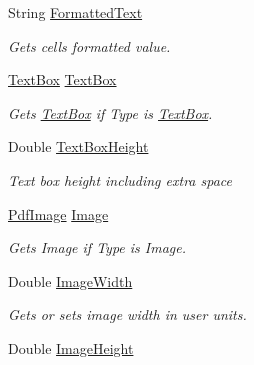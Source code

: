 \begin{DoxyCompactItemize}
String \hyperlink{class_pdf_file_writer_1_1_pdf_table_cell_a3b5c8c5ce7f712cd36ef121752abfe34}{Formatted\+Text}
\begin{DoxyCompactList}\small\item\em Gets cell\textquotesingle{}s formatted value. \end{DoxyCompactList}\item 
\hyperlink{class_pdf_file_writer_1_1_text_box}{Text\+Box} \hyperlink{class_pdf_file_writer_1_1_pdf_table_cell_a9ddbb591ca19d749d56af74626137e67}{Text\+Box}
\begin{DoxyCompactList}\small\item\em Gets \hyperlink{class_pdf_file_writer_1_1_text_box}{Text\+Box} if Type is \hyperlink{class_pdf_file_writer_1_1_text_box}{Text\+Box}. \end{DoxyCompactList}\item 
Double \hyperlink{class_pdf_file_writer_1_1_pdf_table_cell_a40c4f80b748ce11ca1703fac05b5e287}{Text\+Box\+Height}
\begin{DoxyCompactList}\small\item\em Text box height including extra space \end{DoxyCompactList}\item 
\hyperlink{class_pdf_file_writer_1_1_pdf_image}{Pdf\+Image} \hyperlink{class_pdf_file_writer_1_1_pdf_table_cell_aae3e2b72c4d9cee9b656abdff40b13b8}{Image}
\begin{DoxyCompactList}\small\item\em Gets Image if Type is Image. \end{DoxyCompactList}\item 
Double \hyperlink{class_pdf_file_writer_1_1_pdf_table_cell_a6d35c2558eba3fdd14e70bf88bae3624}{Image\+Width}
\begin{DoxyCompactList}\small\item\em Gets or sets image width in user units. \end{DoxyCompactList}\item 
Double \hyperlink{class_pdf_file_writer_1_1_pdf_table_cell_a5fed4820bd97e61c0c81c899859665ad}{Image\+Height}

\end{DoxyCompactItemize}
